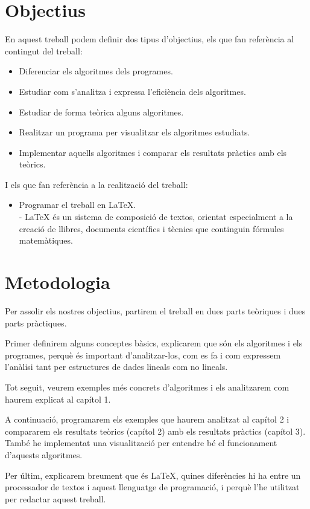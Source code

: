 \section*{Objectius}
En aquest treball podem definir dos tipus d'objectius, els que fan referència al contingut del treball:
\begin{itemize}
    \item Diferenciar els algoritmes dels programes.
    \item Estudiar com s'analitza i expressa l'eficiència dels algoritmes.
    \item Estudiar de forma teòrica alguns algoritmes.
    \item Realitzar un programa per visualitzar els algoritmes estudiats.
    \item Implementar aquells algoritmes i comparar els resultats pràctics amb els teòrics.
\end{itemize}
I els que fan referència a la realització del treball:
\begin{itemize}
    \item Programar el treball en \LaTeX. \\
    - LaTeX és un sistema de composició de textos, orientat especialment a la creació de llibres, documents científics i tècnics que continguin fórmules matemàtiques. 
\end{itemize}

\section*{Metodologia}
Per assolir els nostres objectius, partirem el treball en dues parts teòriques i dues parts pràctiques.

Primer definirem alguns conceptes bàsics, explicarem que són els algoritmes i els programes, perquè és important d'analitzar-los, com es fa i com expressem l'anàlisi tant per estructures de dades lineals com no lineals.

\newpage
Tot seguit, veurem exemples més concrets d'algoritmes i els analitzarem com haurem explicat al capítol 1.

A continuació, programarem els exemples que haurem analitzat al capítol 2 i compararem els resultats teòrics (capítol 2) amb els resultats pràctics (capítol 3). També he implementat una visualització per entendre bé el funcionament d'aquests algoritmes.

Per últim, explicarem breument que és \LaTeX \space, quines diferències hi ha entre un processador de textos i aquest llenguatge de programació, i perquè l'he utilitzat per redactar aquest treball.